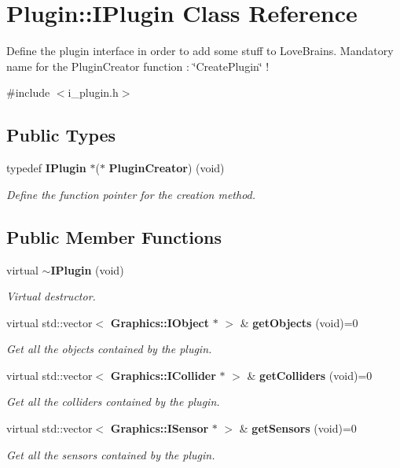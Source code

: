\section{Plugin\+:\+:I\+Plugin Class Reference}
\label{class_plugin_1_1_i_plugin}


Define the plugin interface in order to add some stuff to Love\+Brains. Mandatory name for the Plugin\+Creator function \+: \char`\"{}\+Create\+Plugin\char`\"{} !  




{\ttfamily \#include $<$i\+\_\+plugin.\+h$>$}

\subsection*{Public Types}
\begin{DoxyCompactItemize}
\item 
typedef {\bf I\+Plugin} $\ast$($\ast$ {\bf Plugin\+Creator}) (void)\label{class_plugin_1_1_i_plugin_acabdfce5c711ade0685f6d92b3200fd9}

\begin{DoxyCompactList}\small\item\em Define the function pointer for the creation method. \end{DoxyCompactList}\end{DoxyCompactItemize}
\subsection*{Public Member Functions}
\begin{DoxyCompactItemize}
\item 
virtual {\bf $\sim$\+I\+Plugin} (void)\label{class_plugin_1_1_i_plugin_a8eb9b11fde2be5b2aef3aa4a68979319}

\begin{DoxyCompactList}\small\item\em Virtual destructor. \end{DoxyCompactList}\item 
virtual std\+::vector$<$ {\bf Graphics\+::\+I\+Object} $\ast$ $>$ \& {\bf get\+Objects} (void)=0
\begin{DoxyCompactList}\small\item\em Get all the objects contained by the plugin. \end{DoxyCompactList}\item 
virtual std\+::vector$<$ {\bf Graphics\+::\+I\+Collider} $\ast$ $>$ \& {\bf get\+Colliders} (void)=0
\begin{DoxyCompactList}\small\item\em Get all the colliders contained by the plugin. \end{DoxyCompactList}\item 
virtual std\+::vector$<$ {\bf Graphics\+::\+I\+Sensor} $\ast$ $>$ \& {\bf get\+Sensors} (void)=0
\begin{DoxyCompactList}\small\item\em Get all the sensors contained by the plugin. \end{DoxyCompactList}\end{DoxyCompactItemize}


